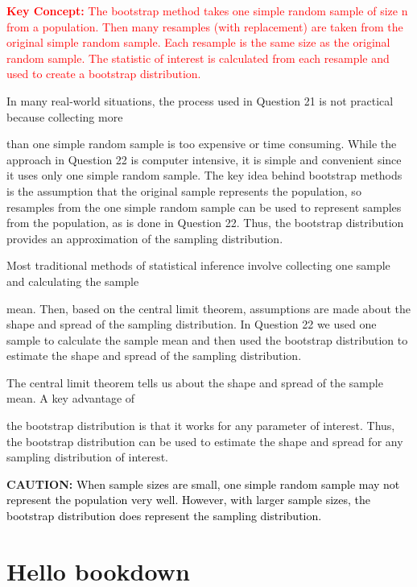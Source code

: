 \documentclass[
]{report}
\theoremstyle{definition}
\theoremstyle{definition}
\theoremstyle{definition}
\theoremstyle{definition}
\theoremstyle{remark}
\begin{document}
\Large

\textbf{\textcolor{red}{Key Concept:}}
\textcolor{red}{The bootstrap method takes one simple random sample of size n from a population. Then many resamples
(with replacement) are taken from the original simple random sample. Each resample is the same
size as the original random sample. The statistic of interest is calculated from each resample and used
to create a bootstrap distribution.}

\normalsize

In many real-world situations, the process used in Question 21 is not practical because collecting more

than one simple random sample is too expensive or time consuming. While the approach in Question 22 is
computer intensive, it is simple and convenient since it uses only one simple random sample. The key idea
behind bootstrap methods is the assumption that the original sample represents the population, so resamples
from the one simple random sample can be used to represent samples from the population, as is done in Question
22. Thus, the bootstrap distribution provides an approximation of the sampling distribution.

Most traditional methods of statistical inference involve collecting one sample and calculating the sample

mean. Then, based on the central limit theorem, assumptions are made about the shape and spread of the
sampling distribution. In Question 22 we used one sample to calculate the sample mean and then used the
bootstrap distribution to estimate the shape and spread of the sampling distribution.

The central limit theorem tells us about the shape and spread of the sample mean. A key advantage of

the bootstrap distribution is that it works for any parameter of interest. Thus, the bootstrap distribution can be
used to estimate the shape and spread for any sampling distribution of interest.

\large

\textbf{CAUTION:}
\textcolor{black}{When sample sizes are small, one simple random sample may not represent the population very well.
However, with larger sample sizes, the bootstrap distribution does represent the sampling distribution.}

\hypertarget{hello-bookdown}{%
\chapter{Hello bookdown}\label{hello-bookdown}}
\end{document}
